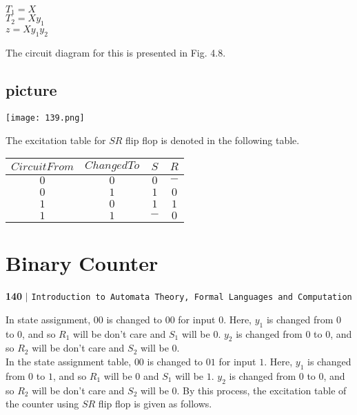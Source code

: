 \documentclass{article}
\begin{document}
\begin{center}
  $T_1 = X$\\
  $T_2 = Xy_1$\\
  $z = Xy_1y_2$\\
\end{center}

The circuit diagram for this is presented in Fig. 4.8.
\begin{center}
\section{picture}
\texttt{[image: 139.png]}
\end{center}

The excitation table for $SR$ flip flop is denoted in the following table.\\
\begin{center}
\begin{tabular}{cccc}
 \hline

 \hline

 \hline

 \hline
 $Circuit From$ &  $Changed To$ & $S$   &  $R$\\
\hline
 $0$    &    $0$    &   $0$   &  $-$\\
 $0$    &    $1$    &   $1$   &  $0$\\
 $1$    &    $0$    &   $1$   &  $1$\\
 $1$    &    $1$    &   $-$   &  $0$\\
 \hline

 \hline

 \hline

 \hline
\end{tabular}
\end{center}

\section*{Binary Counter}
\begin{flushleft}
    \textbf{140}\hspace*{0.1cm} \textbf{$|$} \hspace*{0.1cm} \texttt{Introduction to Automata Theory, Formal Languages and Computation}
  \end{flushleft}

  \vspace*{2cm}
 \hspace*{0.2cm} In state assignment, $00$ is changed to $00$ for input $0$. Here, $y_1$ is changed from $0$ to $0$, and so $R_1$ will
be don’t care and $S_1$ will be $0$. $y_2$ is changed from $0$ to $0$, and so $R_2$ will be don’t care and $S_2$ will be $0$.\\
In the state assignment table, $00$ is changed to $01$ for input $1$. Here, $y_1$ is changed from $0$ to $1$, and so $R_1$
will be $0$ and $S_1$ will be $1$. $y_2$ is changed from $0$ to $0$, and so $R_2$ will be don’t care and $S_2$ will be $0$. By this
process, the excitation table of the counter using $SR$ flip flop is given as follows.\\
\end{document}
